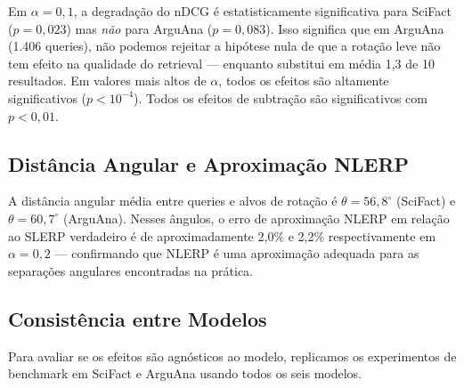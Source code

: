 \documentclass{article}
\begin{document}
Em $\alpha = 0{,}1$, a degradação do nDCG é estatisticamente significativa para SciFact ($p = 0{,}023$) mas \emph{não} para ArguAna ($p = 0{,}083$). Isso significa que em ArguAna (1.406 queries), não podemos rejeitar a hipótese nula de que a rotação leve não tem efeito na qualidade do retrieval --- enquanto substitui em média 1,3 de 10 resultados. Em valores mais altos de $\alpha$, todos os efeitos são altamente significativos ($p < 10^{-4}$). Todos os efeitos de subtração são significativos com $p < 0{,}01$.

\subsection{Distância Angular e Aproximação NLERP}

A distância angular média entre queries e alvos de rotação é $\theta = 56{,}8^{\circ}$ (SciFact) e $\theta = 60{,}7^{\circ}$ (ArguAna). Nesses ângulos, o erro de aproximação NLERP em relação ao SLERP verdadeiro é de aproximadamente 2,0\% e 2,2\% respectivamente em $\alpha = 0{,}2$ --- confirmando que NLERP é uma aproximação adequada para as separações angulares encontradas na prática.

\subsection{Consistência entre Modelos}

Para avaliar se os efeitos são agnósticos ao modelo, replicamos os experimentos de benchmark em SciFact e ArguAna usando todos os seis modelos.
\end{document}
